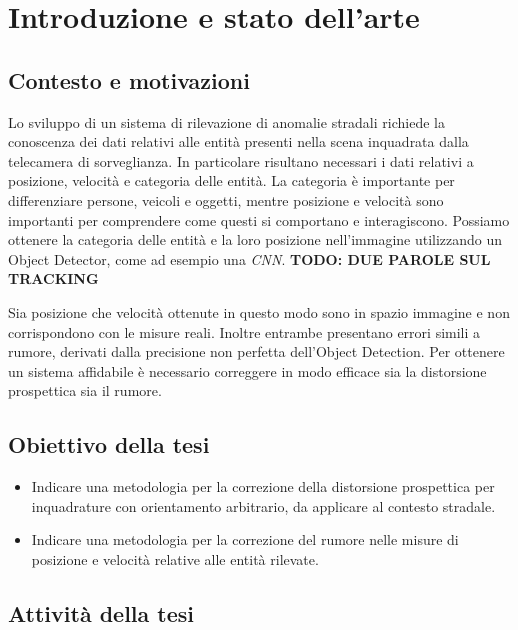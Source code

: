 \chapter{Introduzione e stato dell'arte}
\label{sec:introduzione}


\section{Contesto e motivazioni}

Lo sviluppo di un sistema di rilevazione di anomalie stradali richiede la conoscenza dei dati relativi alle entità presenti nella scena inquadrata dalla telecamera di sorveglianza.
In particolare risultano necessari i dati relativi a posizione, velocità e categoria delle entità.
La categoria è importante per differenziare persone, veicoli e oggetti, mentre posizione e velocità sono importanti per comprendere come questi si comportano e interagiscono.
Possiamo ottenere la categoria delle entità e la loro posizione nell'immagine utilizzando un Object Detector, come ad esempio una \emph{CNN}.
\textbf{TODO: DUE PAROLE SUL TRACKING}

Sia posizione che velocità ottenute in questo modo sono in spazio immagine e non corrispondono con le misure reali.
Inoltre entrambe presentano errori simili a rumore, derivati dalla precisione non perfetta dell'Object Detection.
Per ottenere un sistema affidabile è necessario correggere in modo efficace sia la distorsione prospettica sia il rumore.

\section{Obiettivo della tesi}
\begin{itemize}
	\item Indicare una metodologia per la correzione della distorsione prospettica per inquadrature con orientamento arbitrario, da applicare al contesto stradale.
	\item Indicare una metodologia per la correzione del rumore nelle misure di posizione e velocità relative alle entità rilevate.
\end{itemize}

\section{Attività della tesi}

